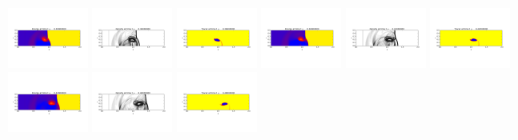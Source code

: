 \documentclass[11pt]{article}
\begin{document}
\includegraphics[width=0.15833333333333333\textwidth]{frame0005fig2.png}
\vskip 10pt 
\includegraphics[width=0.15833333333333333\textwidth]{frame0006fig0.png}
\includegraphics[width=0.15833333333333333\textwidth]{frame0006fig1.png}
\includegraphics[width=0.15833333333333333\textwidth]{frame0006fig2.png}
\includegraphics[width=0.15833333333333333\textwidth]{frame0007fig0.png}
\includegraphics[width=0.15833333333333333\textwidth]{frame0007fig1.png}
\includegraphics[width=0.15833333333333333\textwidth]{frame0007fig2.png}
\vskip 10pt 
\includegraphics[width=0.15833333333333333\textwidth]{frame0008fig0.png}
\includegraphics[width=0.15833333333333333\textwidth]{frame0008fig1.png}
\end{document}
